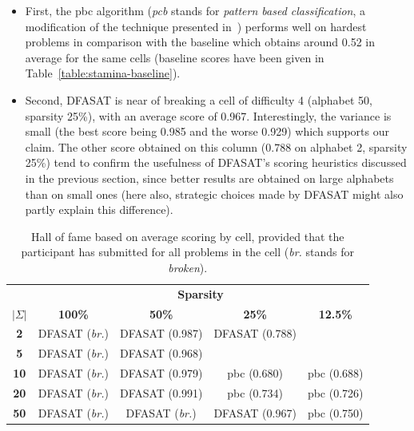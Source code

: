 \begin{itemize}

\item First, the pbc algorithm (\emph{pcb} stands for \emph{pattern based classification}, a modification of the technique presented in~\cite{Lo:2009}) performs well on hardest problems in comparison with the baseline which obtains around 0.52 in average for the same cells (baseline scores have been given in Table~\ref{table:stamina-baseline}). 

\item Second, DFASAT is near of breaking a cell of difficulty 4 (alphabet 50, sparsity 25\%), with an average score of 0.967. Interestingly, the variance is small (the best score being 0.985 and the worse 0.929) which supports our claim. The other score obtained on this column (0.788 on alphabet 2, sparsity 25\%) tend to confirm the usefulness of DFASAT's scoring heuristics discussed in the previous section, since better results are obtained on large alphabets than on small ones (here also, strategic choices made by DFASAT might also partly explain this difference).

\end{itemize}

\begin{table}[H]
\begin{center}
\begin{tabular}{c|c c c c}
&\multicolumn{4}{|c}{\textbf{Sparsity}}\\ 
\textbf{$|\Sigma|$} & \textbf{100\%} & \textbf{50\%} & \textbf{25\%} & \textbf{12.5\%}\\
\hline
\textbf{2}  & DFASAT (\emph{br.}) & DFASAT (0.987)      & DFASAT (0.788) &  \\
\textbf{5}  & DFASAT (\emph{br.}) & DFASAT (0.968)      &                &  \\
\textbf{10} & DFASAT (\emph{br.}) & DFASAT (0.979)      & pbc (0.680)    & pbc (0.688) \\
\textbf{20} & DFASAT (\emph{br.}) & DFASAT (0.991)      & pbc (0.734)    & pbc (0.726) \\
\textbf{50} & DFASAT (\emph{br.}) & DFASAT (\emph{br.}) & DFASAT (0.967) & pbc (0.750) \\
\end{tabular}
\end{center}
\caption{Hall of fame based on average scoring by cell, provided that the participant has submitted for all problems in the cell (\emph{br.} stands for \emph{broken}).\label{table:stamina-hall-of-fame-2}}
\end{table}

